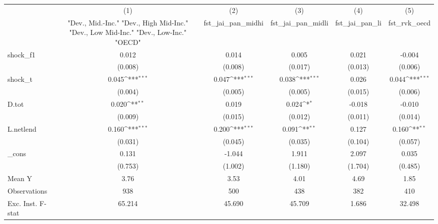 {
\def\sym#1{\ifmmode^{#1}\else\(^{#1}\)\fi}
\begin{tabular}{l*{5}{c}}
\toprule
            &\multicolumn{1}{c}{(1)}&\multicolumn{1}{c}{(2)}&\multicolumn{1}{c}{(3)}&\multicolumn{1}{c}{(4)}&\multicolumn{1}{c}{(5)}\\
            &\multicolumn{1}{c}{ "Dev., Mid.-Inc." "Dev., High Mid-Inc." "Dev., Low Mid-Inc." "Dev., Low-Inc." "OECD" }&\multicolumn{1}{c}{fst\_jai\_pan\_midhi}&\multicolumn{1}{c}{fst\_jai\_pan\_midli}&\multicolumn{1}{c}{fst\_jai\_pan\_li}&\multicolumn{1}{c}{fst\_rvk\_oecd}\\
\midrule
shock\_f1    &       0.012         &       0.014         &       0.005         &       0.021         &      -0.004         \\
            &     (0.008)         &     (0.008)         &     (0.017)         &     (0.013)         &     (0.006)         \\
\addlinespace
shock\_t     &       0.045\sym{***}&       0.047\sym{***}&       0.038\sym{***}&       0.026         &       0.044\sym{***}\\
            &     (0.004)         &     (0.005)         &     (0.005)         &     (0.015)         &     (0.006)         \\
\addlinespace
D.tot       &       0.020\sym{**} &       0.019         &       0.024\sym{*}  &      -0.018         &      -0.010         \\
            &     (0.009)         &     (0.015)         &     (0.012)         &     (0.011)         &     (0.014)         \\
\addlinespace
L.netlend   &       0.160\sym{***}&       0.200\sym{***}&       0.091\sym{**} &       0.127         &       0.160\sym{**} \\
            &     (0.031)         &     (0.045)         &     (0.035)         &     (0.104)         &     (0.057)         \\
\addlinespace
\_cons      &       0.131         &      -1.044         &       1.911         &       2.097         &       0.035         \\
            &     (0.753)         &     (1.002)         &     (1.180)         &     (1.704)         &     (0.485)         \\
\midrule
Mean Y      &        3.76         &        3.53         &        4.01         &        4.69         &        1.85         \\
Observations&         938         &         500         &         438         &         382         &         410         \\
Exc. Inst. F-stat&      65.214         &      45.690         &      45.709         &       1.686         &      32.498         \\
\bottomrule
\end{tabular}
}
